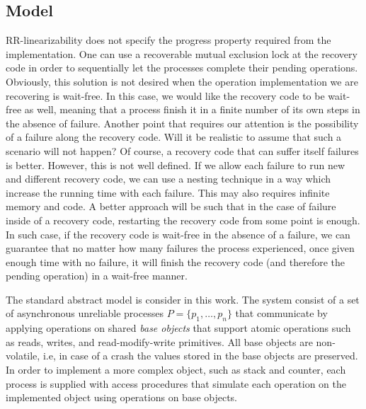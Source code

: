 \documentclass{article}
\begin{document}
\subsection{Model}

RR-linearizability does not specify the progress property required from the implementation. One can use a recoverable mutual exclusion lock \cite{DBLP:conf/podc/GolabR16,DBLP:conf/podc/GolabH17} at the recovery code in order to sequentially let the processes complete their pending operations. Obviously, this solution is not desired when the operation implementation we are recovering is wait-free. In this case, we would like the recovery code to be wait-free as well, meaning that a process finish it in a finite number of its own steps in the absence of failure. Another point that requires our attention is the possibility of a failure along the recovery code. Will it be realistic to assume that such a scenario will not happen? Of course, a recovery code that can suffer itself failures is better. However, this is not well defined. If we allow each failure to run new and different recovery code, we can use a nesting technique in a way which increase the running time with each failure. This may also requires infinite memory and code. A better approach will be such that in the case of failure inside of a recovery code, restarting the recovery code from some point is enough. In such case, if the recovery code is wait-free in the absence of a failure, we can guarantee that no matter how many failures the process experienced, once given enough time with no failure, it will finish the recovery code (and therefore the pending operation) in a wait-free manner.

The standard abstract model is consider in this work. The system consist of a set of asynchronous unreliable processes $P=\{p_1,\ldots,p_n\}$ that communicate by applying operations on shared \emph{base objects} that support atomic operations such as reads, writes, and read-modify-write primitives. All base objects are non-volatile, i.e, in case of a crash the values stored in the base objects are preserved. In order to implement a more complex object, such as stack and counter, each process is supplied with access procedures that simulate each operation on the implemented object using operations on base objects.
\end{document}
